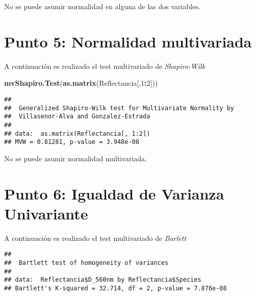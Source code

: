 \documentclass[
]{article}
\newenvironment{Shaded}{\begin{snugshade}}{\end{snugshade}}
\newcommand{\DecValTok}[1]{\textcolor[rgb]{0.00,0.00,0.81}{#1}}
\newcommand{\KeywordTok}[1]{\textcolor[rgb]{0.13,0.29,0.53}{\textbf{#1}}}
\newcommand{\NormalTok}[1]{#1}
\newcommand{\OperatorTok}[1]{\textcolor[rgb]{0.81,0.36,0.00}{\textbf{#1}}}
\newcommand{\StringTok}[1]{\textcolor[rgb]{0.31,0.60,0.02}{#1}}
\begin{document}
No se puede asumir normalidad en alguna de las dos variables.

\hypertarget{punto-5-normalidad-multivariada}{%
\section{Punto 5: Normalidad
multivariada}\label{punto-5-normalidad-multivariada}}

A continuación es realizado el test multivariado de \emph{Shapiro-Wilk}

\begin{Shaded}
\begin{Highlighting}[]
\KeywordTok{mvShapiro.Test}\NormalTok{(}\KeywordTok{as.matrix}\NormalTok{(Reflectancia[,}\DecValTok{1}\OperatorTok{:}\DecValTok{2}\NormalTok{]))}
\end{Highlighting}
\end{Shaded}

\begin{verbatim}
## 
##  Generalized Shapiro-Wilk test for Multivariate Normality by
##  Villasenor-Alva and Gonzalez-Estrada
## 
## data:  as.matrix(Reflectancia[, 1:2])
## MVW = 0.81281, p-value = 3.948e-08
\end{verbatim}

No se puede asumir normalidad multivariada.

\hypertarget{punto-6-igualdad-de-varianza-univariante}{%
\section{Punto 6: Igualdad de Varianza
Univariante}\label{punto-6-igualdad-de-varianza-univariante}}

A continuación es realizado el test multivariado de \emph{Barlett}

\begin{Shaded}
\end{Shaded}

\begin{verbatim}
## 
##  Bartlett test of homogeneity of variances
## 
## data:  Reflectancia$D_560nm by Reflectancia$Species
## Bartlett's K-squared = 32.714, df = 2, p-value = 7.876e-08
\end{verbatim}
\end{document}
